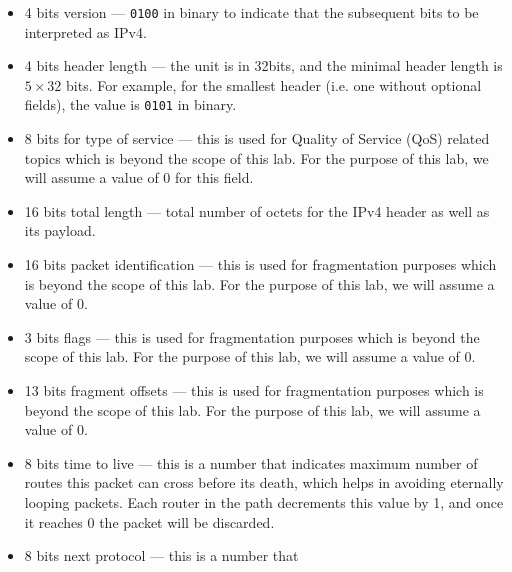 \documentclass[pdftex,12pt,a4paper]{article}
\begin{document}
                \begin{itemize}
                    \item 4 bits version --- \texttt{0100} in binary to
                        indicate that the subsequent bits to be interpreted as
                        IPv4.
                    \item 4 bits header length --- the unit is in 32bits, and
                        the minimal header length is $5 \times 32$ bits. For
                        example, for the smallest header (i.e. one without
                        optional fields), the value is \texttt{0101} in binary.
                    \item 8 bits for type of service --- this is used for
                        Quality of Service (QoS) related topics which is beyond
                        the scope of this lab. For the purpose of this lab, we
                        will assume a value of 0 for this field.
                    \item 16 bits total length --- total number of octets for
                        the IPv4 header as well as its payload.
                    \item 16 bits packet identification --- this is used for
                        fragmentation purposes which is beyond the scope of
                        this lab. For the purpose of this lab, we will assume a
                        value of 0.
                    \item 3 bits flags --- this is used for fragmentation
                        purposes which is beyond the scope of this lab. For the
                        purpose of this lab, we will assume a value of 0.
                    \item 13 bits fragment offsets --- this is used for
                        fragmentation purposes which is beyond the scope of
                        this lab. For the purpose of this lab, we will assume a
                        value of 0.
                    \item 8 bits time to live --- this is a number that
                        indicates maximum number of routes this packet can
                        cross before its death, which helps in avoiding
                        eternally looping packets. Each router in the path
                        decrements this value by 1, and once it reaches 0 the
                        packet will be discarded.
                    \item 8 bits next protocol --- this is a number that

\end{itemize}
\end{document}
